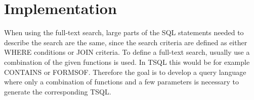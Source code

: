 \newpage
\section{Implementation}
When using the full-text search, large parts of the \ac{SQL} statements needed to describe the search are the same, since the search criteria are defined as either WHERE conditions or JOIN criteria. To define a full-text search, usually use a combination of the given functions is used. In \ac{TSQL} this would be for example CONTAINS or FORMSOF. Therefore the goal is to develop a query language where only a combination of functions and a few parameters is necessary to generate the corresponding \ac{TSQL}.